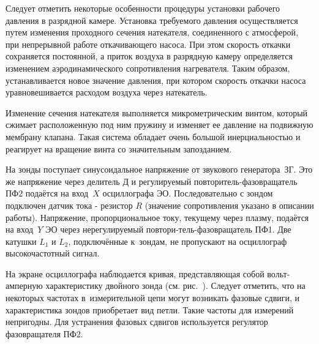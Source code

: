 Следует отметить некоторые особенности процедуры установки рабочего давления в разрядной камере. Установка требуемого давления осуществляется путем изменения проходного сечения натекателя, соединенного с атмосферой, при непрерывной работе откачивающего насоса. При этом скорость откачки сохраняется постоянной, а приток воздуха в разрядную камеру определяется изменением аэродинамического сопротивления нагревателя. Таким образом, устанавливается новое значение давления, при котором скорость откачки насоса уравновешивается расходом воздуха через натекатель.

Изменение сечения натекателя выполняется микрометрическим винтом, который сжимает расположенную под ним пружину и изменяет ее давление на подвижную мембрану клапана. Такая система обладает очень большой инерциальностью и реагирует на вращение винта со значительным запозданием.
 
На зонды поступает синусоидальное напряжение от звукового генератора~ЗГ. Это же напряжение через делитель Д и регулируемый повторитель-фазовращатель ПФ2
подаётся на вход~$X$ осциллографа ЭО. Последовательно с зондом подключен датчик тока - резистор $R$ (значение сопротивления указано в описании работы). Напряжение, пропорциональное току, текущему через плазму, подаётся на вход~$Y$ ЭО через нерегулируемый повтори-тель-фазовращатель ПФ1. Две катушки $L_{1}$  и $L_{2}$, подключённые к~зондам, не пропускают на осциллограф высокочастотный сигнал. 

На экране осциллографа наблюдается кривая, представляющая собой вольт-амперную характеристику двойного зонда (см.
рис.~). Следует отметить, что на некоторых частотах в~измерительной цепи могут возникать фазовые сдвиги, и
характеристика зондов приобретает вид петли. Такие частоты для измерений непригодны. Для устранения фазовых сдвигов используется регулятор фазовращателя ПФ2.  



